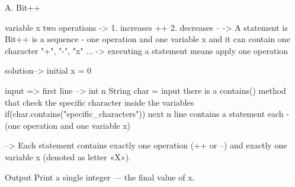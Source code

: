 A. Bit++

variable x
two operations -> 
1. increases ++
2. decreases --
-> A statement is Bit++ is a sequence - one operation and one variable x
      and it can contain one character "+", "-", "x" ...
-> executing a statement means apply one operation 

solution-->
initial x = 0

input =>
first line --> int n
String char = input 
there is a contains() method that check the specific character inside the variables 
if(char.contains("specific_characters"))
next n line contains a statement each - (one operation and one variable x)

--> Each statement contains exactly one operation (++ or --) and
        exactly one variable x (denoted as letter «X»).

Output
Print a single integer — the final value of x.